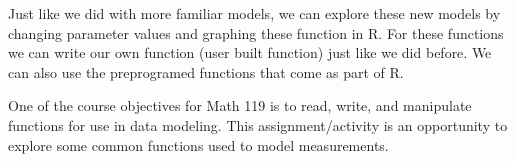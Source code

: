 \documentclass{article}
\begin{document}
\noindent  Just like we did with more familiar models, we can explore these new models by changing parameter values and graphing these function in R. For these functions we can write our own function (user built function) just like we did before. We can also use the preprogramed functions that come as part of R. 

One of the course objectives for Math 119 is to read, write, and manipulate functions for use in data modeling. This assignment/activity is an opportunity to explore some common functions used to model measurements.
\end{document}
